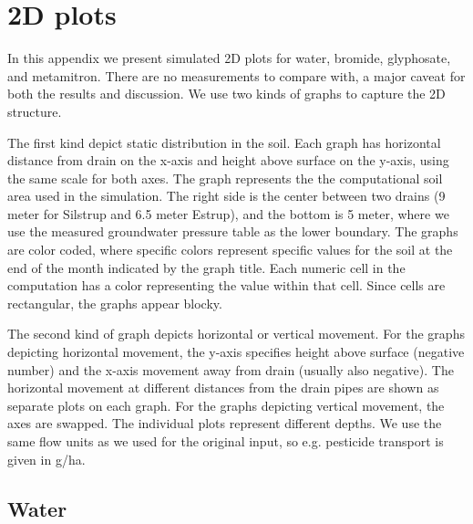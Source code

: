 \newcommand{\figsilstrupl}[1]{\figl\texttt{[image: fig/\#1]}}
\newcommand{\figsilstrup}[1]{\texttt{[image: fig/\#1]}}
\newcommand{\fluxtop}[1]{\figl\texttt{[image: fig/\#1]}}
\newcommand{\figestrupl}[1]{\hspace*{-1cm}\texttt{[image: fig/\#1]}}
\newcommand{\figestrup}[1]{\texttt{[image: fig/\#1]}}

\chapter{2D plots}
\label{app:plot-2d}

In this appendix we present simulated 2D plots for water, bromide,
glyphosate, and metamitron.  There are no measurements to compare
with, a major caveat for both the results and discussion.  We use two
kinds of graphs to capture the 2D structure.

The first kind depict static distribution in the soil.  Each graph has
horizontal distance from drain on the x-axis and height above surface
on the y-axis, using the same scale for both axes.  The graph
represents the the computational soil area used in the simulation.
The right side is the center between two drains (9 meter for Silstrup
and 6.5 meter Estrup), and the bottom is 5 meter, where we use the
measured groundwater pressure table as the lower boundary.  The graphs
are color coded, where specific colors represent specific values for
the soil at the end of the month indicated by the graph title.  Each
numeric cell in the computation has a color representing the value
within that cell.  Since cells are rectangular, the graphs appear
blocky.

The second kind of graph depicts horizontal or vertical movement.  For
the graphs depicting horizontal movement, the y-axis specifies height
above surface (negative number) and the x-axis movement away from
drain (usually also negative).  The horizontal movement at different
distances from the drain pipes are shown as separate plots on each
graph.  For the graphs depicting vertical movement, the axes are
swapped.  The individual plots represent different depths.  We use the
same flow units as we used for the original input, so e.g. pesticide
transport is given in g/ha.

\FloatBarrier
\section{Water}

